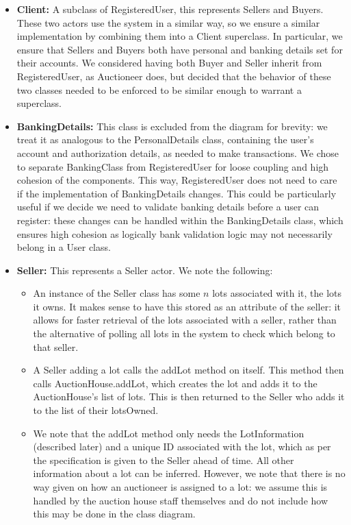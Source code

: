 \documentclass[titlepage, 12pt]{extarticle}
\begin{document}
\begin{itemize}
\item {\bf Client: } A subclass of RegisteredUser, this represents Sellers and Buyers. These two actors use the system in a similar way, so we ensure a similar implementation by combining them into a Client superclass. In particular, we ensure that Sellers and Buyers both have personal and banking details set for their accounts. We considered having both Buyer and Seller inherit from RegisteredUser, as Auctioneer does, but decided that the behavior of these two classes needed to be enforced to be similar enough to warrant a superclass. 
\item {\bf BankingDetails: } This class is excluded from the diagram for brevity: we treat it as analogous to the PersonalDetails class, containing the user's account and authorization details, as needed to make transactions. We chose to separate BankingClass from RegisteredUser for loose coupling and high cohesion of the components. This way, RegisteredUser does not need to care if the implementation of BankingDetails changes. This could be particularly useful if we decide we need to validate banking details before a user can register: these changes can be handled within the BankingDetails class, which ensures high cohesion as logically bank validation logic may not necessarily belong in a User class. 
\item {\bf Seller: } This represents a Seller actor. We note the following:
  \begin{itemize}
  \item An instance of the Seller class has some $n$ lots associated with it, the lots it owns. It makes sense to have this stored as an attribute of the seller: it allows for faster retrieval of the lots associated with a seller, rather than the alternative of polling all lots in the system to check which belong to that seller. 
  \item A Seller adding a lot calls the addLot method on itself. This method then calls AuctionHouse.addLot, which creates the lot and adds it to the AuctionHouse's list of lots. This is then returned to the Seller who adds it to the list of their lotsOwned.
  \item We note that the addLot method only needs the LotInformation (described later) and a unique ID associated with the lot, which as per the specification is given to the Seller ahead of time. All other information about a lot can be inferred. However, we note that there is no way given on how an auctioneer is assigned to a lot: we assume this is handled by the auction house staff themselves and do not include how this may be done in the class diagram.

\end{itemize}
\end{itemize}
\end{document}
